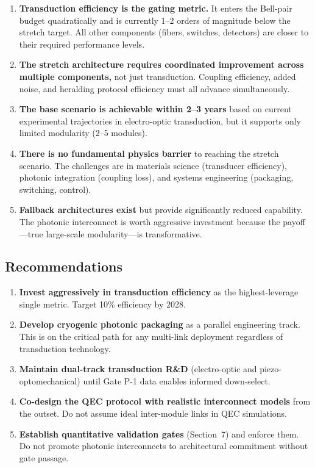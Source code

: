 \documentclass[conference]{IEEEtran}
\begin{document}
\begin{enumerate}
\item \textbf{Transduction efficiency is the gating metric.} It enters the Bell-pair budget quadratically and is currently 1--2 orders of magnitude below the stretch target. All other components (fibers, switches, detectors) are closer to their required performance levels.

\item \textbf{The stretch architecture requires coordinated improvement across multiple components,} not just transduction. Coupling efficiency, added noise, and heralding protocol efficiency must all advance simultaneously.

\item \textbf{The base scenario is achievable within 2--3 years} based on current experimental trajectories in electro-optic transduction, but it supports only limited modularity (2--5 modules).

\item \textbf{There is no fundamental physics barrier} to reaching the stretch scenario. The challenges are in materials science (transducer efficiency), photonic integration (coupling loss), and systems engineering (packaging, switching, control).

\item \textbf{Fallback architectures exist} but provide significantly reduced capability. The photonic interconnect is worth aggressive investment because the payoff---true large-scale modularity---is transformative.
\end{enumerate}

\subsection{Recommendations}

\begin{enumerate}
\item \textbf{Invest aggressively in transduction efficiency} as the highest-leverage single metric. Target 10\% efficiency by 2028.
\item \textbf{Develop cryogenic photonic packaging} as a parallel engineering track. This is on the critical path for any multi-link deployment regardless of transduction technology.
\item \textbf{Maintain dual-track transduction R\&D} (electro-optic and piezo-optomechanical) until Gate P-1 data enables informed down-select.
\item \textbf{Co-design the QEC protocol with realistic interconnect models} from the outset. Do not assume ideal inter-module links in QEC simulations.
\item \textbf{Establish quantitative validation gates} (Section~7) and enforce them. Do not promote photonic interconnects to architectural commitment without gate passage.
\end{enumerate}
\end{document}
